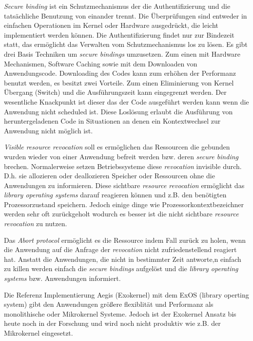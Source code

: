 \documentclass[11pt,technote]{IEEEtran}
\begin{document}
      \textit{Secure binding} ist ein Schutzmechanismus der die Authentifizierung und die tats\"achliche Benutzung von einander trennt.
      Die \"Uberpr\"ufungen sind entweder in einfachen Operationen im Kernel oder Hardware ausgedr\"uckt, die leicht implementiert werden k\"onnen.
      Die Authentifizierung findet nur zur Bindezeit statt, das erm\"oglicht das Verwalten vom Schutzmechanismus los zu l\"osen. Es gibt drei Basis Techniken
      um \textit{secure bindings} umzusetzen. Zum einen mit Hardware Mechanismen, Software Caching sowie mit dem Downloaden von Anwendungscode.
      Downloading des Codes kann zum erh\"ohen der Performanz benutzt werden, es besitzt zwei Vorteile. Zum einen Eliminierung von Kernel \"Ubergang (Switch)
      und die Ausf\"uhrungszeit kann eingegrenzt werden. Der wesentliche Knackpunkt ist dieser das der Code ausgef\"uhrt werden kann wenn die Anwendung nicht
      scheduled ist. Diese Losl\"osung erlaubt die Ausf\"uhrung von heruntergeladenen Code in Situationen an denen ein Kontextwechsel zur
      Anwendung nicht m\"oglich ist.
        
      \textit{Visible resource revocation} soll es erm\"oglichen das Ressourcen die gebunden wurden wieder von einer Anwendung befreit werden  
      bzw. deren \textit{secure binding} brechen. Normalerweise setzen Betriebssysteme diese \textit{revocation} invisible durch. 
      D.h. sie allozieren oder deallozieren Speicher oder Ressourcen ohne die Anwendungen zu informieren.
      Diese sichtbare \textit{resource revocation} erm\"oglicht das \textit{library operating systems} darauf reagieren k\"onnen und
      z.B. den ben\"otigten Prozessorzustand speichern. Jedoch einige dinge wie Prozessorkontextbezeichner werden sehr oft zur\"uckgeholt wodurch
      es besser ist die nicht sichtbare \textit{resource revocation} zu nutzen.
        
      Das \textit{Abort protocol} erm\"oglicht es die Ressource indem Fall zur\"uck zu holen, wenn die Anwendung auf die
      Anfrage der \textit{revocation} nicht zufriedenstellend reagiert hat.
      Anstatt die Anwendungen, die nicht in bestimmter Zeit antworte,n einfach zu killen werden einfach die
      \textit{secure bindings} aufgel\"ost und die \textit{library operating systems} bzw. Anwendungen informiert.
        
      Die Referenz Implementierung Aegis (Exokernel) mit dem ExOS (library operting system) gibt den Anwendungen gr\"o\ss ere flexiblit\"at 
      und Performanz als monolithische oder Mikrokernel Systeme. Jedoch ist der Exokernel Ansatz bis heute noch in der Forschung und wird
      noch nicht produktiv wie z.B. der Mikrokernel eingesetzt.
        
\end{document}
